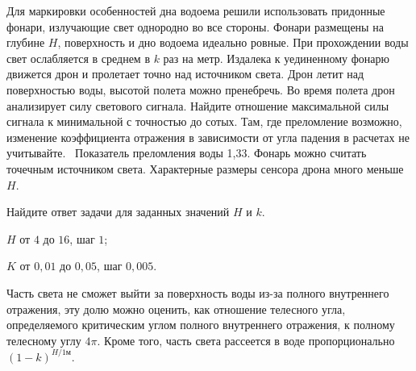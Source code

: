 
Для маркировки особенностей дна водоема решили
использовать придонные фонари,
излучающие свет однородно во все стороны. Фонари размещены на глубине $H$,
поверхность и дно водоема идеально ровные. При прохождении воды свет ослабляется в
среднем в $k$ раз на метр. Издалека к уединенному фонарю движется дрон и пролетает точно 
над источником света. Дрон летит над поверхностью воды, высотой полета можно пренебречь. 
Во время полета дрон анализирует силу светового сигнала. Найдите отношение максимальной силы сигнала к
минимальной с точностью до сотых. Там, где преломление возможно, изменение
коэффициента отражения в зависимости от угла падения в расчетах не учитывайте.
 Показатель преломления воды 1,33. Фонарь
можно считать точечным источником света. Характерные размеры сенсора дрона много меньше $H$.         

Найдите ответ задачи для заданных значений $H$ и $k$.

\paramSection

$H$ от $4$ до $16$, шаг $1$;

$K$ от $0,01$ до $0,05$, шаг $0,005$.

\solutionSection

Часть света не сможет выйти за поверхность воды из-за полного внутреннего отражения, эту долю можно оценить, 
как отношение телесного угла, определяемого критическим углом полного внутреннего отражения, к полному телесному углу $4\pi$.  
Кроме того, часть света рассеется в воде пропорционально $(1-k)^{H/1\text{м}}$.

